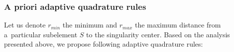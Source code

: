 
\subsubsection{A priori adaptive quadrature rules} \label{sec:adaptive_quad_rules}
Let us denote $r_{min}$ the minimum and $r_{max}$ the maximum distance from a~particular subelement $S$ to the singularity center. 
Based on the analysis presented above, we propose following adaptive quadrature rules:



